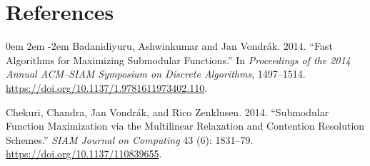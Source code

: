 \documentclass[11pt]{article} %
\theoremstyle{definition}
\begin{document}
\section{References}
\noindent 

\parskip 0em
\leftskip 2em
\parindent -2em
%
%
%
%
Badanidiyuru, Ashwinkumar and Jan Vondrák. 2014. ``Fast Algorithms for Maximizing Submodular Functions.'' In \emph{Proceedings of the 2014 Annual ACM--SIAM Symposium on Discrete Algorithms}, 1497--1514. \url{https://doi.org/10.1137/1.9781611973402.110}.

%
%
%
%
%
%
%
Chekuri, Chandra, Jan Vondr\'ak, and Rico Zenklusen. 2014. ``Submodular Function Maximization via the Multilinear Relaxation and Contention Resolution Schemes.'' \emph{SIAM Journal on Computing} 43 (6): 1831--79. \url{https://doi.org/10.1137/110839655}.
\end{document}
